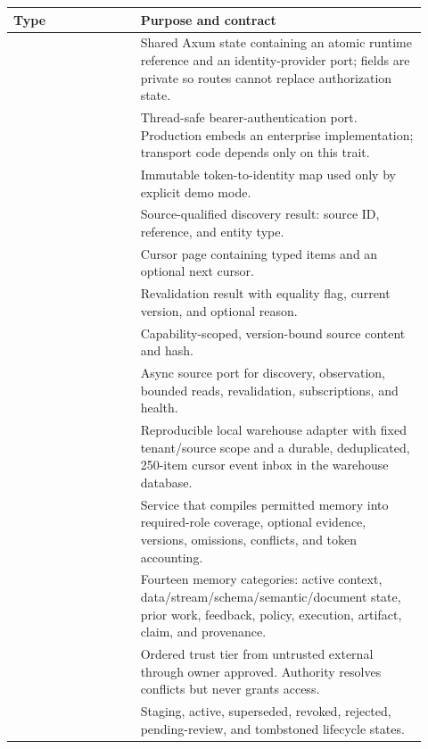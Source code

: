 \begin{longtable}{L{0.29\linewidth}L{0.63\linewidth}}
\toprule
\textbf{Type} & \textbf{Purpose and contract} \\
\midrule
\endhead
{} & Shared Axum state containing an atomic runtime reference and an identity-provider port; fields are private so routes cannot replace authorization state. \\
 & Thread-safe bearer-authentication port. Production embeds an enterprise implementation; transport code depends only on this trait. \\
 & Immutable token-to-identity map used only by explicit demo mode. \\
 & Source-qualified discovery result: source ID, reference, and entity type. \\
 & Cursor page containing typed items and an optional next cursor. \\
 & Revalidation result with equality flag, current version, and optional reason. \\
 & Capability-scoped, version-bound source content and hash. \\
 & Async source port for discovery, observation, bounded reads, revalidation, subscriptions, and health. \\
 & Reproducible local warehouse adapter with fixed tenant/source scope and a durable, deduplicated, 250-item cursor event inbox in the warehouse database. \\
 & Service that compiles permitted memory into required-role coverage, optional evidence, versions, omissions, conflicts, and token accounting. \\
 & Fourteen memory categories: active context, data/stream/schema/semantic/document state, prior work, feedback, policy, execution, artifact, claim, and provenance. \\
 & Ordered trust tier from untrusted external through owner approved. Authority resolves conflicts but never grants access. \\
 & Staging, active, superseded, revoked, rejected, pending-review, and tombstoned lifecycle states. \\

\end{longtable}
